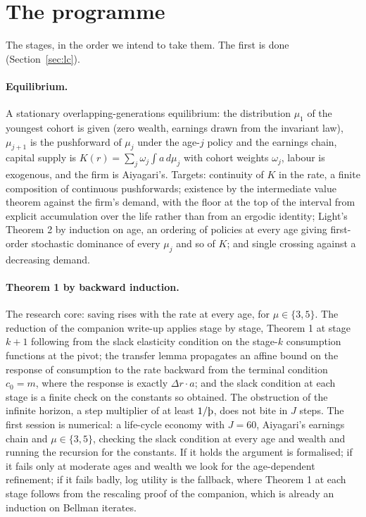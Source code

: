\section{The programme}\label{sec:prog}

The stages, in the order we intend to take them. The first is done (Section~\ref{sec:lc}).

\paragraph{Equilibrium.} A stationary overlapping-generations equilibrium: the distribution
$\mu_1$ of the youngest cohort is given (zero wealth, earnings drawn from the invariant law),
$\mu_{j+1}$ is the pushforward of $\mu_j$ under the age-$j$ policy and the earnings chain,
capital supply is $K(r)=\sum_j\omega_j\int a\,d\mu_j$ with cohort weights $\omega_j$, labour is
exogenous, and the firm is Aiyagari's. Targets: continuity of $K$ in the rate, a finite composition
of continuous pushforwards; existence by the intermediate value theorem against the firm's demand,
with the floor at the top of the interval from explicit accumulation over the life rather than from
an ergodic identity; Light's Theorem 2 by induction on age, an ordering of policies at every age
giving first-order stochastic dominance of every $\mu_j$ and so of $K$; and single crossing
against a decreasing demand.

\paragraph{Theorem 1 by backward induction.} The research core: saving rises with the rate at
every age, for $\mu\in\{3,5\}$. The reduction of the companion write-up applies stage by stage,
Theorem 1 at stage $k+1$ following from the slack elasticity condition on the stage-$k$
consumption functions at the pivot; the transfer lemma propagates an affine bound on the response
of consumption to the rate backward from the terminal condition $c_0=m$, where the response is
exactly $\Delta r\cdot a$; and the slack condition at each stage is a finite check on the
constants so obtained. The obstruction of the infinite horizon, a step multiplier of at least
$1/\Thorn$, does not bite in $J$ steps. The first session is numerical: a life-cycle economy with
$J=60$, Aiyagari's earnings chain and $\mu\in\{3,5\}$, checking the slack condition at every age
and wealth and running the recursion for the constants. If it holds the argument is formalised;
if it fails only at moderate ages and wealth we look for the age-dependent refinement; if it fails
badly, log utility is the fallback, where Theorem 1 at each stage follows from the rescaling proof
of the companion, which is already an induction on Bellman iterates.

